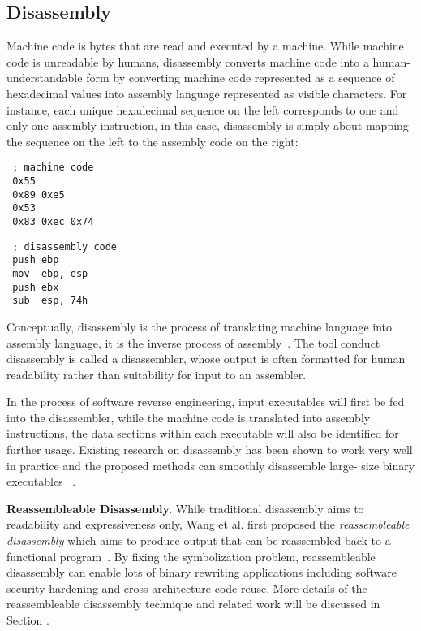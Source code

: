 \subsection{Disassembly} \label{sec:background-disassembly}

Machine code is bytes that are read and executed by a machine. While machine
code is unreadable by humans, disassembly converts machine code into a
human-understandable form by converting machine code represented as a sequence
of hexadecimal values into assembly language represented as visible characters.
For instance, each unique hexadecimal sequence on the left corresponds to one
and only one assembly instruction, in this case, disassembly is simply about
mapping the sequence on the left to the assembly code on the right:

\vspace*{3pt}
\noindent\hspace*{36pt}\begin{minipage}{.40\linewidth}
\begin{lstlisting}
 ; machine code
 0x55
 0x89 0xe5
 0x53
 0x83 0xec 0x74
\end{lstlisting}
\end{minipage}\hspace*{24pt}
\begin{minipage}{.40\linewidth}
\begin{lstlisting}
 ; disassembly code
 push ebp
 mov  ebp, esp
 push ebx
 sub  esp, 74h
\end{lstlisting}
\end{minipage}

Conceptually, disassembly is the process of translating machine language into
assembly language, it is the inverse process of
assembly~\cite{schwarz2002disassembly,wang2015reassembleable,bauman2018superset}.
The tool conduct disassembly is called a disassembler, whose output is often
formatted for human readability rather than suitability for input to an
assembler.

In the process of software reverse engineering, input executables will first be
fed into the disassembler, while the machine code is translated into assembly
instructions, the data sections within each executable will also be identified
for further usage. Existing research on disassembly has been shown to work
very well in practice and the proposed methods can smoothly disassemble large-
size binary executables
~\cite{balakrishnan2010wysinwyx,kruegel2004static,wang2015reassembleable}.

\noindent \textbf{Reassembleable Disassembly.} While traditional disassembly
aims to readability and expressiveness only, Wang et al. first proposed the
\textit{reassembleable disassembly} which aims to produce output that can be
reassembled back to a functional program~\cite{wang2015reassembleable}. By
fixing the symbolization problem, reassembleable disassembly can enable lots
of binary rewriting applications including software security hardening and
cross-architecture code reuse. More details of the reassembleable disassembly
technique and related work will be discussed in Section .


